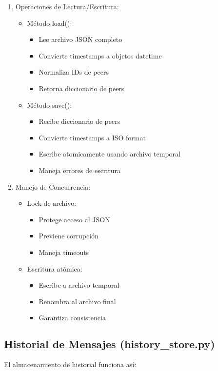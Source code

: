 \documentclass[12pt]{article}
\begin{document}
\begin{enumerate}
    \item Operaciones de Lectura/Escritura:
    \begin{itemize}
        \item Método load():
        \begin{itemize}
            \item Lee archivo JSON completo
            \item Convierte timestamps a objetos datetime
            \item Normaliza IDs de peers
            \item Retorna diccionario de peers
        \end{itemize}
        \item Método save():
        \begin{itemize}
            \item Recibe diccionario de peers
            \item Convierte timestamps a ISO format
            \item Escribe atomicamente usando archivo temporal
            \item Maneja errores de escritura
        \end{itemize}
    \end{itemize}

    \item Manejo de Concurrencia:
    \begin{itemize}
        \item Lock de archivo:
        \begin{itemize}
            \item Protege acceso al JSON
            \item Previene corrupción
            \item Maneja timeouts
        \end{itemize}
        \item Escritura atómica:
        \begin{itemize}
            \item Escribe a archivo temporal
            \item Renombra al archivo final
            \item Garantiza consistencia
        \end{itemize}
    \end{itemize}
\end{enumerate}

\subsection{Historial de Mensajes (history\_store.py)}
El almacenamiento de historial funciona así:
\end{document}

